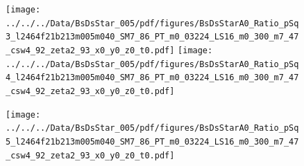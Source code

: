 \documentclass[a4paper,10pt]{article}
\begin{document}
\clearpage
\begin{figure}[p]
 \texttt{[image: ../../../Data/BsDsStar\_005/pdf/figures/BsDsStarA0\_Ratio\_pSq3\_l2464f21b213m005m040\_SM7\_86\_PT\_m0\_03224\_LS16\_m0\_300\_m7\_47\_csw4\_92\_zeta2\_93\_x0\_y0\_z0\_t0.pdf]} 
 \texttt{[image: ../../../Data/BsDsStar\_005/pdf/figures/BsDsStarA0\_Ratio\_pSq4\_l2464f21b213m005m040\_SM7\_86\_PT\_m0\_03224\_LS16\_m0\_300\_m7\_47\_csw4\_92\_zeta2\_93\_x0\_y0\_z0\_t0.pdf]} 
 \end{figure}
\begin{figure}[p]
 \texttt{[image: ../../../Data/BsDsStar\_005/pdf/figures/BsDsStarA0\_Ratio\_pSq5\_l2464f21b213m005m040\_SM7\_86\_PT\_m0\_03224\_LS16\_m0\_300\_m7\_47\_csw4\_92\_zeta2\_93\_x0\_y0\_z0\_t0.pdf]} 
 \end{figure}
\clearpage
\end{document}
